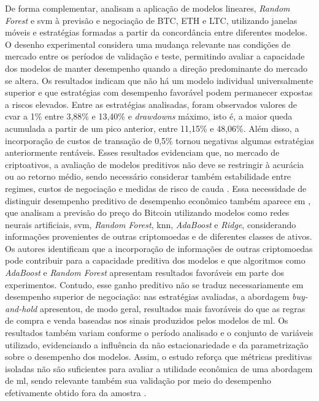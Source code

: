 De forma complementar,  analisam a aplicação de modelos lineares, \textit{Random Forest} e \acf{svm} à previsão e negociação de BTC, ETH e LTC, utilizando janelas móveis e estratégias formadas a partir da concordância entre diferentes modelos. O desenho experimental considera uma mudança relevante nas condições de mercado entre os períodos de validação e teste, permitindo avaliar a capacidade dos modelos de manter desempenho quando a direção predominante do mercado se altera. Os resultados indicam que não há um modelo individual universalmente superior e que estratégias com desempenho favorável podem permanecer expostas a riscos elevados. Entre as estratégias analisadas, foram observados valores de \ac{cvar} a 1\% entre 3,88\% e 13,40\% e \textit{drawdowns} máximo, isto é, a maior queda acumulada a partir de um pico anterior, entre 11,15\% e 48,06\%. Além disso, a incorporação de custos de transação de 0,5\% tornou negativas algumas estratégias anteriormente rentáveis. Esses resultados evidenciam que, no mercado de criptoativos, a avaliação de modelos preditivos não deve se restringir à acurácia ou ao retorno médio, sendo necessário considerar também estabilidade entre regimes, custos de negociação e medidas de risco de cauda \cite{sebastiao2021forecasting}. Essa necessidade de distinguir desempenho preditivo de desempenho econômico também aparece em , que analisam a previsão do preço do Bitcoin utilizando modelos como redes neurais artificiais, \acs{svm}, \textit{Random Forest}, \ac{knn}, \textit{AdaBoost} e \textit{Ridge}, considerando informações provenientes de outras criptomoedas e de diferentes classes de ativos. Os autores identificam que a incorporação de informações de outras criptomoedas pode contribuir para a capacidade preditiva dos modelos e que algoritmos como \textit{AdaBoost} e \textit{Random Forest} apresentam resultados favoráveis em parte dos experimentos. Contudo, esse ganho preditivo não se traduz necessariamente em desempenho superior de negociação: nas estratégias avaliadas, a abordagem \textit{buy-and-hold} apresentou, de modo geral, resultados mais favoráveis do que as regras de compra e venda baseadas nos sinais produzidos pelos modelos de \acl{ml}. Os resultados também variam conforme o período analisado e o conjunto de variáveis utilizado, evidenciando a influência da não estacionariedade e da parametrização sobre o desempenho dos modelos. Assim, o estudo reforça que métricas preditivas isoladas não são suficientes para avaliar a utilidade econômica de uma abordagem de \acl{ml}, sendo relevante também sua validação por meio do desempenho efetivamente obtido fora da amostra \cite{chevallier2021forecast}.

